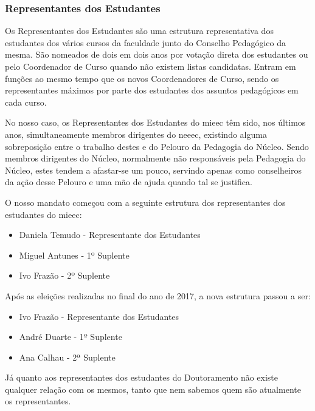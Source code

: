 
\subsubsection{Representantes dos Estudantes}

Os Representantes dos Estudantes são uma estrutura representativa dos estudantes dos vários cursos da faculdade junto do Conselho Pedagógico da mesma. São nomeados de dois em dois anos por votação direta dos estudantes ou pelo Coordenador de Curso quando não existem listas candidatas. Entram em funções ao mesmo tempo que os novos Coordenadores de Curso, sendo os representantes máximos por parte dos estudantes dos assuntos pedagógicos em cada curso.

No nosso caso, os Representantes dos Estudantes do \acrfull{mieec} têm sido, nos últimos anos, simultaneamente membros dirigentes do \acrshort{neeec}, existindo alguma sobreposição entre o trabalho destes e do Pelouro da Pedagogia do Núcleo. Sendo membros dirigentes do Núcleo, normalmente não responsáveis pela Pedagogia do Núcleo, estes tendem a afastar-se um pouco, servindo apenas como conselheiros da ação desse Pelouro e uma mão de ajuda quando tal se justifica.

O nosso mandato começou com a seguinte estrutura dos representantes dos estudantes do \acrshort{mieec}:
\begin{itemize}
\item Daniela Temudo - Representante dos Estudantes
\item Miguel Antunes - 1º Suplente
\item Ivo Frazão - 2º Suplente
\end{itemize}

Após as eleições realizadas no final do ano de 2017, a nova estrutura passou a ser:
\begin{itemize}
\item Ivo Frazão - Representante dos Estudantes
\item André Duarte - 1º Suplente
\item Ana Calhau - 2ª Suplente
\end{itemize}

Já quanto aos representantes dos estudantes do Doutoramento não existe qualquer relação com os mesmos, tanto que nem sabemos quem são atualmente os representantes.